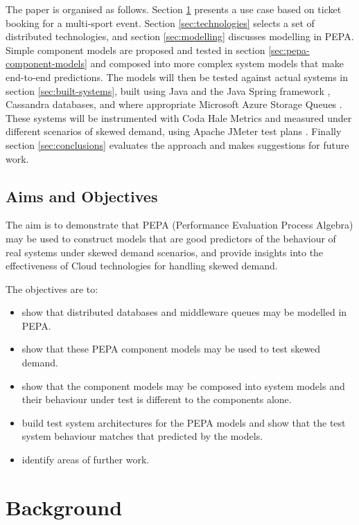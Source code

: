\documentclass[runningheads]{llncs}
\begin{document}
The paper is organised as follows.  Section \ref{sec:background} presents a use case based on ticket booking for a multi-sport event.  Section \ref{sec:technologies} selects a set of distributed technologies, and section \ref{sec:modelling} discusses modelling in PEPA.  Simple component models are proposed and tested in section \ref{sec:pepa-component-models} and composed into more complex system models that make end-to-end predictions.
The models will then be tested against actual systems in section \ref{sec:built-systems}, built using Java and the Java Spring framework \cite{RN1076}, Cassandra \cite{RN1050}\cite{RN1075} databases, and where appropriate Microsoft Azure Storage Queues \cite{RN1072}.  These systems will be instrumented with Coda Hale Metrics \cite{RN1079} and measured under different scenarios of skewed demand, using Apache JMeter test plans \cite{RN1074}.  Finally section \ref{sec:conclusions} evaluates the approach and makes suggestions for future work.

\subsection{Aims and Objectives}

The aim is to demonstrate that PEPA (Performance Evaluation Process Algebra) \cite{RN1051} may be used to construct models that are good predictors of the behaviour of real systems under skewed demand scenarios, and provide insights into the effectiveness of Cloud technologies for handling skewed demand.

The objectives are to:
\begin{itemize}
	\item show that distributed databases and middleware queues may be modelled in PEPA.
	\item show that these PEPA component models may be used to test skewed demand.
	\item show that the component models may be composed into system models and their behaviour under test is different to the components alone.
	\item build test system architectures for the PEPA models and show that the test system behaviour matches that predicted by the models.
	\item identify areas of further work.
\end{itemize}

%
%

\section{Background}\label{sec:background}
\end{document}
